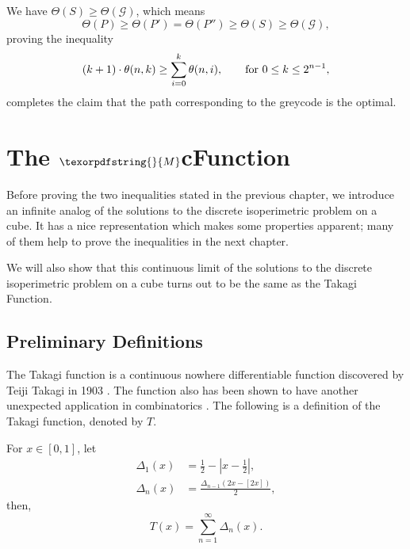 \documentclass[12pt]{ucthesis}
\theoremstyle{plain}
\theoremstyle{definition}
\newcommand{\takagi}{
  \texorpdfstring{\protect}{M}
}
\begin{document}
We have $\Theta(S) \ge \Theta(\mathcal{G})$, which means
\begin{equation*}
\Theta(P) \ge \Theta(P') = \Theta(P'') \ge \Theta(S) \ge \Theta(\mathcal{G}),
\end{equation*}
proving the inequality
\begin{equation}
\label{Equation 2.4}
(k + 1) \cdot \theta(n, k) \ge \sum_{i = 0}^k \theta(n, i),
\qquad \textnormal{for } 0 \le k \le 2^{n - 1},
\end{equation}
completes the claim that the path corresponding to the greycode is the optimal.

\chapter{The $\takagi$cFunction}
\label{Chapter 3}

Before proving the two inequalities stated in the previous chapter,
we introduce an infinite analog of the solutions to the discrete isoperimetric problem on a cube.
It has a nice representation which makes some properties apparent;
many of them help to prove the inequalities in the next chapter.

We will also show that this continuous limit of the solutions to
the discrete isoperimetric problem on a cube turns out to be the same as the Takagi Function.

\section{Preliminary Definitions}
\label{Section 3.1}

The Takagi function is a continuous nowhere differentiable function
discovered by Teiji Takagi in 1903 \cite{Takagi.1973}.
The function also has been shown to have another unexpected application in combinatorics \cite{Frankl.1995}.
The following is a definition of the Takagi function, denoted by $T$.

For $x \in [0, 1]$, let
\begin{align*}
\Delta_1(x) & = \frac{1}{2} - \left|x - \frac{1}{2}\right|, \\
\Delta_n(x) & = \frac{\Delta_{n - 1}(2 x - [2 x])}{2},
\end{align*}
then,
\begin{equation*}
T(x) = \sum_{n = 1}^\infty \Delta_n(x).
\end{equation*}
\end{document}
